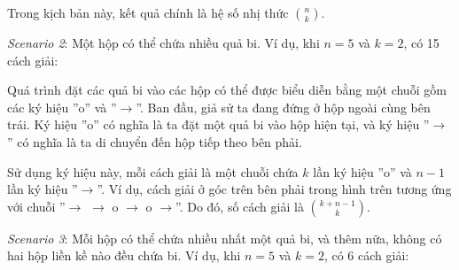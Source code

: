 Trong kịch bản này, kết quả chính là
hệ số nhị thức ${n \choose k}$.

\textit{Scenario 2}: Một hộp có thể chứa nhiều quả bi.
Ví dụ, khi $n=5$ và $k=2$,
có 15 cách giải:

\begin{center}
\end{center}

Quá trình đặt các quả bi vào các hộp
có thể được biểu diễn bằng một chuỗi
gồm các ký hiệu
''o'' và ''$\rightarrow$''.
Ban đầu, giả sử ta đang đứng ở hộp ngoài cùng bên trái.
Ký hiệu ''o'' có nghĩa là ta đặt một quả bi
vào hộp hiện tại, và ký hiệu
''$\rightarrow$'' có nghĩa là ta di chuyển đến
hộp tiếp theo bên phải.

Sử dụng ký hiệu này, mỗi cách giải là một chuỗi
chứa $k$ lần ký hiệu ''o'' và
$n-1$ lần ký hiệu ''$\rightarrow$''.
Ví dụ, cách giải ở góc trên bên phải
trong hình trên tương ứng với chuỗi
''$\rightarrow$ $\rightarrow$ o $\rightarrow$ o $\rightarrow$''.
Do đó, số cách giải là
${k+n-1 \choose k}$.

\textit{Scenario 3}: Mỗi hộp có thể chứa nhiều nhất một quả bi,
và thêm nữa, không có hai hộp liền kề nào đều chứa bi.
Ví dụ, khi $n=5$ và $k=2$,
có 6 cách giải:


